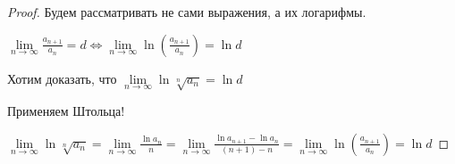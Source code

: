 \begin{proof}\thmslashn
	
	Будем рассматривать не сами выражения, а их логарифмы.

	$\lim\limits_{n \to \infty} \frac{a_{n+1}}{a_n} = d \iff \lim\limits_{n \to \infty} \ln(\frac{a_{n+1}}{a_n}) = \ln d$

	Хотим доказать, что $\lim\limits_{n \to \infty} \ln \sqrt[n]{a_n} = \ln d$
	

	Применяем Штольца!
	
	$\lim\limits_{n \to \infty} \ln \sqrt[n]{a_n} = \lim\limits_{n \to \infty} \frac{\ln a_n}{n} = \lim\limits_{n \to \infty} \frac{\ln a_{n+1} - \ln a_n}{(n+1) - n} = \lim\limits_{n \to \infty} \ln (\frac{a_{n+1}}{a_n}) = \ln d$
	
\end{proof}

